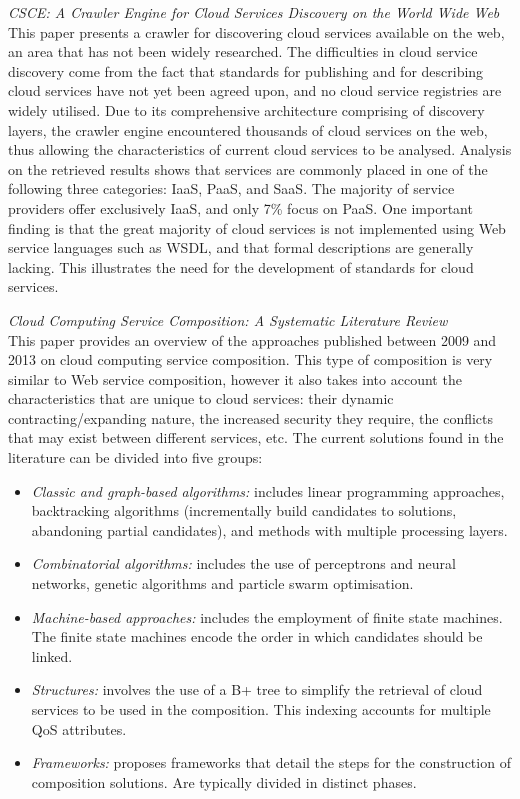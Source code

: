 \textit{CSCE: A Crawler Engine for Cloud Services Discovery on the World Wide Web \cite{noor2013csce}}\\
This paper presents a crawler for discovering cloud services available on the web, an area that has not been widely researched. The difficulties
in cloud service discovery come from the fact that standards for publishing and for describing cloud services have not yet been agreed upon, and
no cloud service registries are widely utilised. Due to its comprehensive architecture comprising of discovery layers, the crawler engine encountered
thousands of cloud services on the web, thus allowing the characteristics of current cloud services to be analysed. Analysis on the retrieved results
shows that services are commonly placed in one of the following three categories: IaaS, PaaS, and SaaS. The majority of service providers offer exclusively IaaS,
and only 7\% focus on PaaS. One important finding is that the great majority of cloud services is not implemented using Web service languages such
as WSDL, and that formal descriptions are generally lacking. This illustrates the need for the development of standards for cloud services.

\textit{Cloud Computing Service Composition: A Systematic Literature Review \cite{jula2014cloud}}\\
This paper provides an overview of the approaches published between 2009 and 2013 on cloud computing service composition. This type of composition is very similar to Web service
composition, however it also takes into account the characteristics that are unique to cloud services: their dynamic contracting/expanding nature, the increased security they require,
the conflicts that may exist between different services, etc. The current solutions found in the literature can be divided into five groups:

\begin{itemize}
 \item \textit{Classic and graph-based algorithms:} includes linear programming approaches, backtracking algorithms (incrementally build candidates to solutions, abandoning partial candidates), and methods with multiple processing layers.
 \item \textit{Combinatorial algorithms:} includes the use of perceptrons and neural networks, genetic algorithms and particle swarm optimisation.
 \item \textit{Machine-based approaches:} includes the employment of finite state machines. The finite state machines encode the order in which candidates should be linked.
 \item \textit{Structures:} involves the use of a B+ tree to simplify the retrieval of cloud services to be used in the composition. This indexing accounts for multiple QoS attributes.
 \item \textit{Frameworks:} proposes frameworks that detail the steps for the construction of composition solutions. Are typically divided in distinct phases.
\end{itemize}

